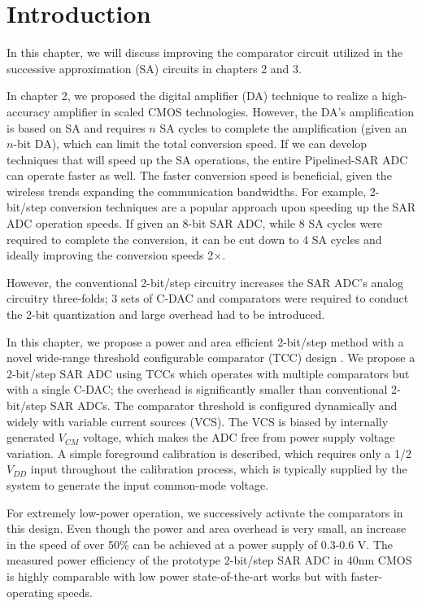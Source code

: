 \section{Introduction}

In this chapter, we will discuss improving the comparator circuit utilized in the successive approximation (SA) circuits in chapters 2 and 3.

In chapter 2, we proposed the digital amplifier (DA) technique to realize a high-accuracy amplifier in scaled CMOS technologies. However, the DA's amplification is based on SA and requires $n$ SA cycles to complete the amplification (given an $n$-bit DA), which can limit the total conversion speed.
If we can develop techniques that will speed up the SA operations, the entire Pipelined-SAR ADC can operate faster as well. The faster conversion speed is beneficial, given the wireless trends expanding the communication bandwidths. 
For example, 2-bit/step conversion techniques are a popular approach upon speeding up the SAR ADC operation speeds. If given an 8-bit SAR ADC, while 8 SA cycles were required to complete the conversion, it can be cut down to 4 SA cycles and ideally improving the conversion speeds 2$\times$.

However, the conventional 2-bit/step circuitry increases the SAR ADC's analog circuitry three-folds; 3 sets of C-DAC and comparators were required to conduct the 2-bit quantization and large overhead had to be introduced. 


In this chapter, we propose a power and area efficient 2-bit/step method with a novel wide-range threshold configurable comparator (TCC) design \cite{yoshioka20158} \cite{yoshiokaessirc}. 
We propose a 2-bit/step SAR ADC using TCCs which operates with multiple comparators but with a single C-DAC; the overhead is significantly smaller than conventional 2-bit/step SAR ADCs. The comparator threshold is configured dynamically and widely with variable current sources (VCS). The VCS is biased by internally generated $V_{CM}$ voltage, which makes the ADC free from power supply voltage variation. A simple foreground calibration is described, which requires only a 1/2 $V_{DD}$ input throughout the calibration process, which is typically supplied by the system to generate the input common-mode voltage. 

For extremely low-power operation, we successively activate the comparators in this design. Even though the power and area overhead is very small, an increase in the speed of over 50\% can be achieved at a power supply of 0.3-0.6 V. The measured power efficiency of the prototype 2-bit/step SAR ADC in 40nm CMOS is highly comparable with low power state-of-the-art works but with faster-operating speeds.

